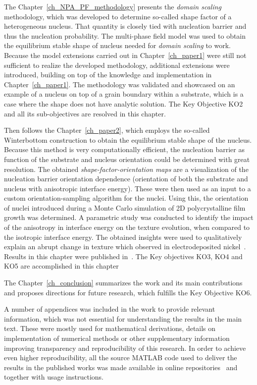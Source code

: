 The Chapter~\ref{ch_NPA_PF_methodology} presents the \textit{domain scaling} methodology, which was developed to determine so-called shape factor of a heterogeneous nucleus. That quantity is closely tied with nucleation barrier and thus the nucleation probability. The multi-phase field model was used to obtain the equilibrium stable shape of nucleus needed for \textit{domain scaling} to work. Because the model extensions carried out in Chapter~\ref{ch_paper1} were still not sufficient to realize the developed methodology, additional extensions were introduced, building on top of the knowledge and implementation in Chapter~\ref{ch_paper1}. The methodology was validated and showcased on an example of a nucleus on top of a grain boundary within a substrate, which is a case where the shape does not have analytic solution. The Key Objective KO2 and all its sub-objectives are resolved in this chapter.

Then follows the Chapter~\ref{ch_paper2}, which employs the so-called Winterbottom construction to obtain the equilibrium stable shape of the nucleus. Because this method is very computationally efficient, the nucleation barrier as function of the substrate and nucleus orientation could be determined with great resolution. The obtained \textit{shape-factor-orientation maps} are a visualization of the nucleation barrier orientation dependence (orientation of both the substrate and nucleus with anisotropic interface energy). These were then used as an input to a custom orientation-sampling algorithm for the nuclei. Using this, the orientation of nuclei introduced during a Monte Carlo simulation of 2D polycrystalline film growth was determined. A parametric study was conducted to identify the impact of the anisotropy in interface energy on the texture evolution, when compared to the isotropic interface energy. The obtained insights were used to qualitatively explain an abrupt change in texture which observed in electrodeposited nickel~\cite{Alimadadi2016}. Results in this chapter were published in~\cite{Minar2024}. The Key objectives KO3, KO4 and KO5 are accomplished in this chapter

The Chapter~\ref{ch_conclusion} summarizes the work and its main contributions and proposes directions for future research, which fulfills the Key Objective KO6.

A number of appendices was included in the work to provide relevant information, which was not essential for understanding the results in the main text. These were mostly used for mathematical derivations, details on implementation of numerical methods or other supplementary information improving transparency and reproducibility of this research. In order to achieve even higher reproducibility, all the source MATLAB code used to deliver the results in the published works was made available in online repositories~\cite{Minar2022dataset} and~\cite{Minar2023dataset} together with usage instructions.

